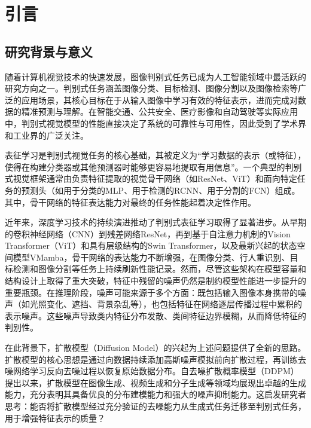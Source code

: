﻿\setlength{\baselineskip}{20pt}
\chapter{引言}
\label{cha:intro}

\section{研究背景与意义}

随着计算机视觉技术的快速发展，图像判别式任务已成为人工智能领域中最活跃的研究方向之一。判别式任务涵盖图像分类\cite{agarap2017architecture,albawi2017understanding,deng2012mnist}、目标检测\cite{ren2015faster,he2017mask,redmon2018yolov3}、图像分割\cite{long2015fully,xie2021segformer}以及图像检索\cite{lin2015deep,weyand2020google}等广泛的应用场景，其核心目标在于从输入图像中学习有效的特征表示，进而完成对数据的精准预测与理解。在智能交通、公共安全、医疗影像和自动驾驶等实际应用中，判别式视觉模型的性能直接决定了系统的可靠性与可用性，因此受到了学术界和工业界的广泛关注。

表征学习是判别式视觉任务的核心基础，其被定义为``学习数据的表示（或特征），使得在构建分类器或其他预测器时能够更容易地提取有用信息''\cite{bengio2013representation}。一个典型的判别式视觉框架通常由负责特征提取的视觉骨干网络（如ResNet\cite{he2016deep}、ViT\cite{dosovitskiy2020image}）和面向特定任务的预测头（如用于分类的MLP\cite{krizhevsky2012imagenet}、用于检测的RCNN\cite{ren2015faster}、用于分割的FCN\cite{long2015fully}）组成。其中，骨干网络的特征表达能力对最终的任务性能起着决定性作用。

近年来，深度学习技术的持续演进推动了判别式表征学习取得了显著进步。从早期的卷积神经网络（CNN）\cite{lecun1998gradient,krizhevsky2012imagenet}到残差网络ResNet\cite{he2016deep}，再到基于自注意力机制的Vision Transformer（ViT）\cite{dosovitskiy2020image,vaswani2017attention}和具有层级结构的Swin Transformer\cite{liu2021swin}，以及最新兴起的状态空间模型VMamba\cite{liu2024vmamba}，骨干网络的表达能力不断增强，在图像分类\cite{deng2009imagenet}、行人重识别\cite{ye2021deep,bedagkar2014survey}、目标检测\cite{he2017mask,carion2020end}和图像分割\cite{long2015fully,zhou2017scene}等任务上持续刷新性能记录。然而，尽管这些架构在模型容量和结构设计上取得了重大突破，特征中残留的噪声仍然是制约模型性能进一步提升的重要瓶颈。在推理阶段，噪声可能来源于多个方面：既包括输入图像本身携带的噪声（如光照变化、遮挡、背景杂乱等），也包括特征在网络逐层传播过程中累积的表示噪声。这些噪声导致类内特征分布发散、类间特征边界模糊，从而降低特征的判别性。

在此背景下，扩散模型（Diffusion Model）的兴起为上述问题提供了全新的思路。扩散模型\cite{sohl2015deep}的核心思想是通过向数据持续添加高斯噪声模拟前向扩散过程，再训练去噪网络学习反向去噪过程以恢复原始数据分布。自去噪扩散概率模型（DDPM）\cite{ho2020denoising}提出以来，扩散模型在图像生成\cite{rombach2022high,ramesh2021zero}、视频生成\cite{ho2022imagen}和分子生成\cite{hoogeboom2022equivariant}等领域均展现出卓越的生成能力，充分表明其具备优良的分布建模能力和强大的噪声抑制能力\cite{10419041}。这启发研究者思考：能否将扩散模型经过充分验证的去噪能力从生成式任务迁移至判别式任务，用于增强特征表示的质量？

